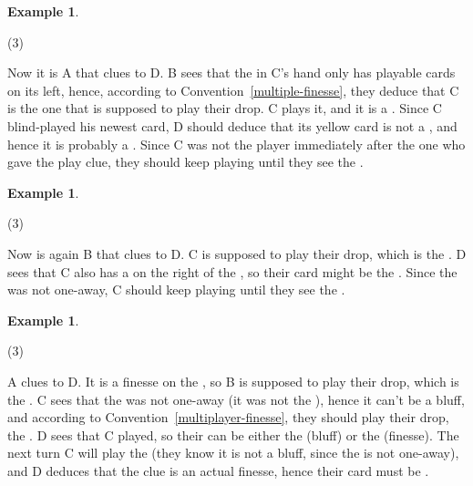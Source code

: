 \documentclass[a4paper]{article}
\theoremstyle{plain}
\theoremstyle{definition}
\newtheorem{example}[theorem]{Example}
\begin{document}
\begin{example}
	\hfill
	\begin{tasks}(3)
		\task[+]      
		\task[A]    
		\task[B]    
		\task[C]    
		\task[D]    
		\task[E]    
	\end{tasks}
	
	Now it is A that clues  to D. B sees that the  in C's hand only has playable cards on its left, hence, according to Convention~\ref{multiple-finesse}, they deduce that C is the one that is supposed to play their drop. C plays it, and it is a . Since C blind-played his newest card, D should deduce that its yellow card is not a , and hence it is probably a . Since C was not the player immediately after the one who gave the play clue, they should keep playing until they see the .
\end{example}

\begin{example}
	\hfill
	\begin{tasks}(3)
		\task[+]      
		\task[A]    
		\task[B]    
		\task[C]    
		\task[D]    
		\task[E]    
	\end{tasks}
	
	Now is again B that clues  to D. C is supposed to play their drop, which is the . D sees that C also has a  on the right of the , so their card might be the . Since the  was not one-away, C should keep playing until they see the .
\end{example}

\begin{example}
	\hfill
	\begin{tasks}(3)
		\task[+]      
		\task[A]    
		\task[B]    
		\task[C]    
		\task[D]    
		\task[E]    
	\end{tasks}
	
	A clues  to D. It is a finesse on the , so B is supposed to play their drop, which is the . C sees that the  was not one-away (it was not the ), hence it can't be a bluff, and according to Convention~\ref{multiplayer-finesse}, they should play their drop, the . D sees that C played, so their  can be either the  (bluff) or the  (finesse). The next turn C will play the  (they know it is not a bluff, since the  is not one-away), and D deduces that the clue is an actual finesse, hence their card must be .
\end{example}
\end{document}
